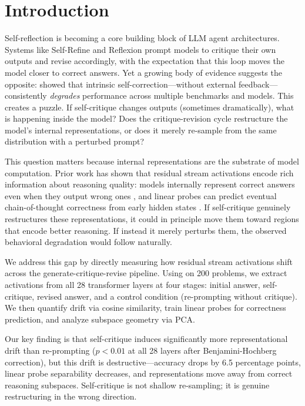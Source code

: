\section{Introduction}
\label{sec:intro}

Self-reflection is becoming a core building block of LLM agent architectures. Systems like Self-Refine \cite{madaan2023selfrefine} and Reflexion \cite{shinn2023reflexion} prompt models to critique their own outputs and revise accordingly, with the expectation that this loop moves the model closer to correct answers. Yet a growing body of evidence suggests the opposite: \citet{huang2024selfcorrect} showed that intrinsic self-correction---without external feedback---consistently \emph{degrades} performance across multiple benchmarks and models. This creates a puzzle. If self-critique changes outputs (sometimes dramatically), what is happening inside the model? Does the critique-revision cycle restructure the model's internal representations, or does it merely re-sample from the same distribution with a perturbed prompt?

This question matters because internal representations are the substrate of model computation. Prior work has shown that residual stream activations encode rich information about reasoning quality: models internally represent correct answers even when they output wrong ones \cite{garner2025probing}, and linear probes can predict eventual chain-of-thought correctness from early hidden states \cite{david2025temporal}. If self-critique genuinely restructures these representations, it could in principle move them toward regions that encode better reasoning. If instead it merely perturbs them, the observed behavioral degradation would follow naturally.

We address this gap by directly measuring how residual stream activations shift across the generate-critique-revise pipeline. Using \qwen on 200 \gsmk problems, we extract activations from all 28 transformer layers at four stages: initial answer, self-critique, revised answer, and a control condition (re-prompting without critique). We then quantify drift via cosine similarity, train linear probes for correctness prediction, and analyze subspace geometry via PCA.

Our key finding is that self-critique induces significantly more representational drift than re-prompting ($p < 0.01$ at all 28 layers after Benjamini-Hochberg correction), but this drift is destructive---accuracy drops by 6.5 percentage points, linear probe separability decreases, and representations move away from correct reasoning subspaces. Self-critique is not shallow re-sampling; it is genuine restructuring in the wrong direction.

